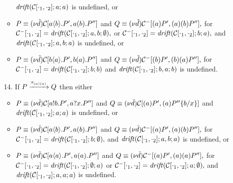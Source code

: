 \begin{lemma}{\label{lemm:inv_on_lts}}
\begin{itemize}
\begin{itemize}
	$\mathit {drift}(\mathcal{C}[\cdot_1, \cdot_2 ]; a;a)$ is undefined, or
	\item $P\equiv (\nu \tilde {d})\mathcal{C}[a\langle b\rangle.P', a(b).P'']$ and $Q\equiv (\nu \tilde {d})\mathcal{C}^-[ (a)P', (a)(b)P''],$ for \\
	 $\mathcal{C}^-[\cdot_1,\cdot_2]=\mathit {drift}(\mathcal{C}[\cdot_1, \cdot_2 ];a,b; \emptyset),$ or $\mathcal{C}^-[\cdot_1,\cdot_2]=\mathit {drift}(\mathcal{C}[\cdot_1, \cdot_2 ]; b; a),$ and
	 $\mathit {drift}(\mathcal{C}[\cdot_1, \cdot_2 ]; a,b;a)$ is undefined, or
	\item $P\equiv (\nu \tilde {d})\mathcal{C}[b\langle a\rangle.P', b(a).P'']$ and $Q\equiv (\nu \tilde {d})\mathcal{C}^-[(b)P', (b)(a)P''],$ for \\
	$\mathcal{C}^-[\cdot_1,\cdot_2]=\mathit {drift}(\mathcal{C}[\cdot_1, \cdot_2 ]; b;b)$  and $\mathit {drift}(\mathcal{C}[\cdot_1, \cdot_2 ]; b,a;b)$ is undefined.
	\end{itemize}	
\item[14.] If $P\xrightarrow{\tau_{(a) (a)}}Q$ then either
	\begin{itemize}
	\item  $P\equiv (\nu \tilde {d})\mathcal{C}[a!b.P', a?x.P'']$ and $Q\equiv(\nu \tilde {d})\mathcal{C}[(a)P', (a)P''\{b/x\}]$ 
	      and \\
	      $\mathit {drift}(\mathcal{C}[\cdot_1, \cdot_2 ]; a; a)$ is undefined, or
	\item $P\equiv (\nu \tilde {d})\mathcal{C}[a\langle b\rangle.P', a(b).P'']$ and $Q\equiv (\nu \tilde {d})\mathcal{C}^-[ (a)P', (a)(b)P''],$ for \\
	      $\mathcal{C}^-[\cdot_1,\cdot_2]=\mathit {drift}(\mathcal{C}[\cdot_1, \cdot_2 ];b; \emptyset),$  and  $\mathit {drift}(\mathcal{C}[\cdot_1, \cdot_2 ]; a, b; a)$ is undefined, or
	\item $P\equiv (\nu \tilde {d})\mathcal{C}[a\langle a\rangle.P', a(a).P'']$ and $Q\equiv (\nu \tilde {d})\mathcal{C}^-[(a)P', (a)(a)P''],$ for \\
	     $\mathcal{C}^-[\cdot_1,\cdot_2]=\mathit {drift}(\mathcal{C}[\cdot_1, \cdot_2 ]; \emptyset;a)$ or $\mathcal{C}^-[\cdot_1,\cdot_2]=\mathit {drift}(\mathcal{C}[\cdot_1, \cdot_2 ]; a; \emptyset),$
	     and $\mathit {drift}(\mathcal{C}[\cdot_1, \cdot_2 ]; a, a; a)$ is undefined.

\end{itemize}
\end{itemize}
\end{lemma}
